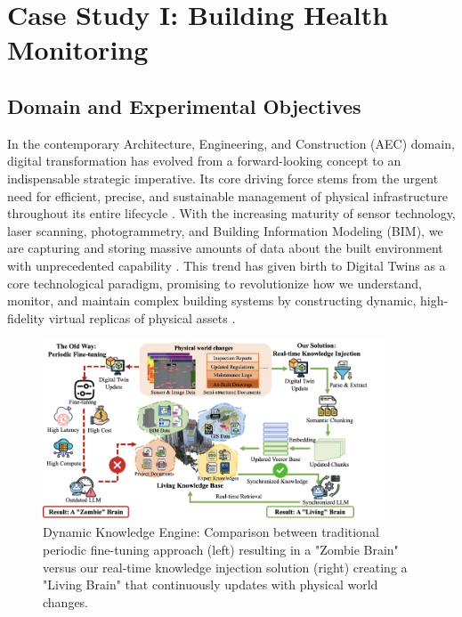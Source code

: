 
\chapter{Case Study I: Building Health Monitoring} \label{chp:building}

\section{Domain and Experimental Objectives}

In the contemporary Architecture, Engineering, and Construction (AEC) domain, digital transformation has evolved from a forward-looking concept to an indispensable strategic imperative. Its core driving force stems from the urgent need for efficient, precise, and sustainable management of physical infrastructure throughout its entire lifecycle \cite{boje2020towards, lu2020digital}. With the increasing maturity of sensor technology, laser scanning, photogrammetry, and Building Information Modeling (BIM), we are capturing and storing massive amounts of data about the built environment with unprecedented capability \cite{tang2019retrieving, li2024single}. This trend has given birth to Digital Twins as a core technological paradigm, promising to revolutionize how we understand, monitor, and maintain complex building systems by constructing dynamic, high-fidelity virtual replicas of physical assets \cite{tao2018digital}.

\begin{figure}[htbp]
\centering
\includegraphics[width=0.9\textwidth]{figures/DefectGPT/dynamic_knowledge_engine.png}
\caption{Dynamic Knowledge Engine: Comparison between traditional periodic fine-tuning approach (left) resulting in a "Zombie Brain" versus our real-time knowledge injection solution (right) creating a "Living Brain" that continuously updates with physical world changes.}
\label{fig:dynamic-knowledge-engine}
\end{figure}

